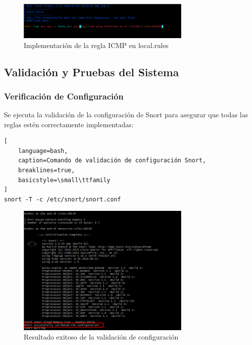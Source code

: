 \documentclass[12pt,a4paper]{article}
\begin{document}
\begin{figure}[H]
  \centering
  \includegraphics[width=0.75\textwidth]{./assets/img15.png}
  \caption{Implementación de la regla ICMP en local.rules}
  \label{fig:icmp-rule}
\end{figure}

\subsection{Validación y Pruebas del Sistema}

\subsubsection{Verificación de Configuración}

Se ejecuta la validación de la configuración de Snort para asegurar que todas
las reglas estén correctamente implementadas:

\begin{lstlisting}[
    language=bash, 
    caption=Comando de validación de configuración Snort,
    breaklines=true,
    basicstyle=\small\ttfamily
]
snort -T -c /etc/snort/snort.conf
\end{lstlisting}

\begin{figure}[H]
  \centering
  \includegraphics[width=0.75\textwidth]{./assets/img16.png}
  \caption{Resultado exitoso de la validación de configuración}
  \label{fig:config-validation}
\end{figure}
\end{document}

